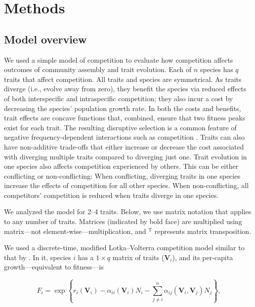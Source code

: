 
\section*{Methods}


\subsection*{Model overview}

We used a simple model of competition to evaluate how competition affects outcomes of
community assembly and trait evolution.
Each of $n$ species has $q$ traits that affect competition.
All traits and species are symmetrical.
As traits diverge (i.e., evolve away from zero), they benefit the species via reduced
effects of both interspecific and intraspecific competition;
they also incur a cost by decreasing the species' population growth rate.
In both the costs and benefits, trait effects are concave functions that,
combined, ensure that two fitness peaks exist for each trait.
The resulting disruptive selection is a common feature of
negative frequency-dependent interactions such as competition
\citep{Rosenzweig:1978bj,Doebeli:2000iq,Abrams:1993cr}.
Traits can also have non-additive trade-offs that either increase or decrease the cost
associated with diverging multiple traits compared to diverging just one.
Trait evolution in one species also affects competition experienced by others.
This can be either conflicting or non-conflicting:
When conflicting, diverging traits in one species increase the effects of competition
for all other species.
When non-conflicting, all competitors' competition is reduced when traits diverge in
one species.

We analyzed the model for 2--4 traits.
Below, we use matrix notation that applies to any number of traits.
Matrices (indicated by bold face) are multiplied using matrix---not
element-wise---multiplication,
and ${}^{\textrm{T}}$ represents matrix transposition.

We used a discrete-time, modified Lotka--Volterra competition model similar to
that by \citet{Northfield:2013if}.
In it, species $i$ has a $1 \times q$ matrix of traits ($\mathbf{V}_i$), and
its per-capita growth---equivalent to fitness---is

\begin{equation} \label{eq:fitness}
    F_{i} = \exp \left\{ r_i(\mathbf{V}_i) - \alpha_{ii}(\mathbf{V}_i) N_i - \sum_{j \ne i}^{n}{
        \alpha_{ij}(\mathbf{V}_i, \mathbf{V}_j) N_j}  \right\}\textrm{,}
\end{equation}

